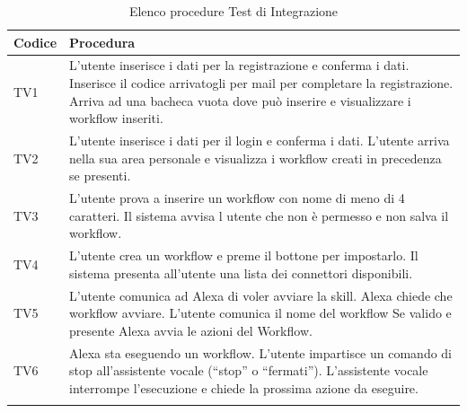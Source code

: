 \begin{center}
	\centering
	\renewcommand{\arraystretch}{1.5}
	\begin{longtable}{  p{1.5cm}  p{12.5cm} }
		\rowcolor{tableHeadYellow}
		\textbf{Codice}   & \textbf{Procedura}  \\ 
		\endhead		
		TV1 & L’utente inserisce i dati per la registrazione e conferma i dati. Inserisce il codice arrivatogli per mail per completare la registrazione. Arriva ad una bacheca vuota dove può inserire e visualizzare i workflow inseriti. \\
		TV2 & L’utente inserisce i dati per il login e conferma i dati. L’utente arriva nella sua area personale e visualizza i workflow creati in precedenza se presenti. \\
		TV3 & L’utente prova a inserire un workflow con nome di meno di 4 caratteri. Il sistema avvisa l utente che non è permesso e non salva il workflow. \\
		TV4 & L’utente crea un workflow e preme il bottone per impostarlo. Il sistema presenta all’utente una lista dei connettori disponibili. \\
		TV5 & L’utente comunica ad Alexa di voler avviare la skill. Alexa chiede che workflow avviare. L’utente comunica il nome del workflow Se valido e presente Alexa avvia le azioni del Workflow. \\
		TV6 & Alexa sta eseguendo un workflow. L’utente impartisce un comando di stop all’assistente vocale (“stop” o “fermati”). L’assistente vocale interrompe l’esecuzione e chiede la prossima azione da eseguire. \\
		\rowcolor{white}
		\caption{Elenco procedure Test di Integrazione}
	\end{longtable}
\end{center}
\pagebreak
